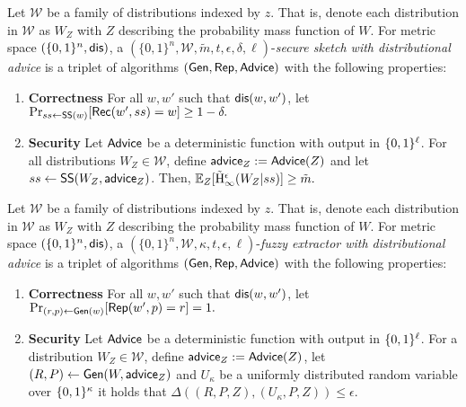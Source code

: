 \begin{definition}
\label{def:ss distributional}
Let $\mathcal{W}$ be a family of distributions indexed by $z$.  That is, denote each distribution in $\mathcal{W}$ as $W_Z$ with $Z$ describing the probability mass function of $W$.  
For metric space $(\{0,1\}^n, \mathsf{dis})$, a $(\{0,1\}^n, \mathcal{W}, \tilde{m}, t, \epsilon, \delta, \ell)$-\emph{secure sketch with distributional advice} is a triplet of algorithms $({\mathsf{Gen}}, {\mathsf{Rep}}, {\mathsf{Advice}})$ with the following properties:
\begin{enumerate} 
\itemsep0em
\item \textbf{Correctness} For all $w, w'$ such that $\mathsf{dis}(w, w')$, let $\Pr_{ss \leftarrow {\ensuremath{\mathsf{SS}}}(w)}[{\mathsf{Rec}}(w', ss) = w]\ge 1-\delta.$
\item \textbf{Security} Let ${\mathsf{Advice}}$ be a deterministic function with output in $\{0, 1\}^\ell$.  For all distributions $W_Z \in \mathcal{W}$, define ${\mathsf{advice}}_Z:= {\mathsf{Advice}}(Z)$ and let $ss \leftarrow {\ensuremath{\mathsf{SS}}}(W_Z, {\mathsf{advice}}_Z)$. Then,
$
\operatorname*{\mathbb{E}}_{Z} [\tilde{\mathrm{H}}_\infty^\epsilon(W_Z| ss)] \ge \tilde{m}.
$
\end{enumerate}
\end{definition}


\begin{definition}
\label{def:fe distributional}
Let $\mathcal{W}$ be a family of distributions indexed by $z$.  That is, denote each distribution in $\mathcal{W}$ as $W_Z$ with $Z$ describing the probability mass function of $W$.  
For metric space $(\{0,1\}^n, \mathsf{dis})$, a $(\{0,1\}^n, \mathcal{W}, \kappa, t, \epsilon, \ell)$-\emph{fuzzy extractor with distributional advice} is a triplet of algorithms $({\mathsf{Gen}}, {\mathsf{Rep}}, {\mathsf{Advice}})$ with the following properties:
\begin{enumerate} 
\itemsep0em
\item \textbf{Correctness} For all $w, w'$ such that $\mathsf{dis}(w, w')$, let $\Pr_{(r, p) \leftarrow {\ensuremath{\mathsf{Gen}}}(w)}[{\mathsf{Rep}}(w', p) = r]=1.$
\item \textbf{Security} Let ${\mathsf{Advice}}$ be a deterministic function with output in $\{0, 1\}^\ell$.  For a distribution $W_Z \in \mathcal{W}$, define ${\mathsf{advice}}_Z:= {\mathsf{Advice}}(Z)$, let $(R, P) \leftarrow {\ensuremath{\mathsf{Gen}}}(W, {\mathsf{advice}}_Z)$ and $U_\kappa$ be a uniformly distributed random variable over $\{0, 1\}^\kappa$ it holds that $\Delta((R, P, Z), (U_\kappa, P, Z))\le \epsilon.$
\end{enumerate}
\end{definition}

